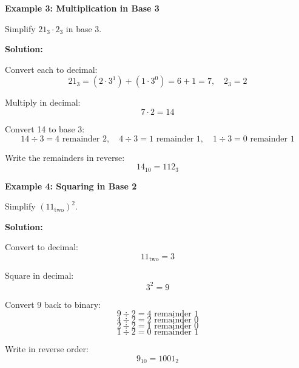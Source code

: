 \begin{flushleft}
\textbf{Example 3: Multiplication in Base 3}

Simplify \(21_3 \cdot 2_3\) in base 3.

\textbf{Solution:} \vspace{0.2cm}

Convert each to decimal:  
\[
21_3 = (2 \cdot 3^1) + (1 \cdot 3^0) = 6 + 1 = 7, \quad 2_3 = 2
\]

Multiply in decimal:  
\[
7 \cdot 2 = 14
\]

Convert 14 to base 3:  
\[
14 \div 3 = 4 \text{ remainder } 2, \quad 4 \div 3 = 1 \text{ remainder } 1, \quad 1 \div 3 = 0 \text{ remainder } 1
\]

Write the remainders in reverse:  
\[
14_{10} = 112_3
\]
\end{flushleft}

\begin{flushleft}
\textbf{Example 4: Squaring in Base 2}

Simplify \((11_{\text{two}})^2\).

\textbf{Solution:} \vspace{0.2cm}

Convert to decimal:  
\[
11_{\text{two}} = 3
\]

Square in decimal:  
\[
3^2 = 9
\]

Convert 9 back to binary:  
\[
9 \div 2 = 4 \text{ remainder } 1
\]
\[
4 \div 2 = 2 \text{ remainder } 0
\]
\[
2 \div 2 = 1 \text{ remainder } 0
\]
\[
1 \div 2 = 0 \text{ remainder } 1
\]

Write in reverse order:  
\[
9_{10} = 1001_2
\]
\end{flushleft}
